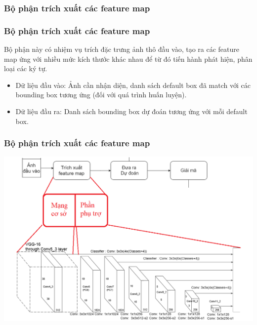 \documentclass{beamer}
\begin{document}
	\subsubsection{Bộ phận trích xuất các feature map}
	\begin{frame}
		\frametitle{Bộ phận trích xuất các feature map}
		Bộ phận này có nhiệm vụ trích đặc trưng ảnh thô đầu vào, tạo ra các feature map ứng với nhiều mức kích thước khác nhau để từ đó tiến hành phát hiện, phân loại các ký tự.
		
		\begin{itemize}
			\item Dữ liệu đầu vào: Ảnh cần nhận diện, danh sách default box đã match với các bounding box tương ứng (đối với quá trình huấn luyện).
			\item Dữ liệu đầu ra: Danh sách bounding box dự đoán tương ứng với mỗi default box.
		\end{itemize}
		
		
		
		
		
	\end{frame}
	
	
	\begin{frame}
		\frametitle{Bộ phận trích xuất các feature map}
		
		\begin{center}
			\centering
			\includegraphics[width=0.85\linewidth]{pipeline2.png}
			\vspace{0.5cm}
		\end{center}
		
	\end{frame}
	
\end{document}
